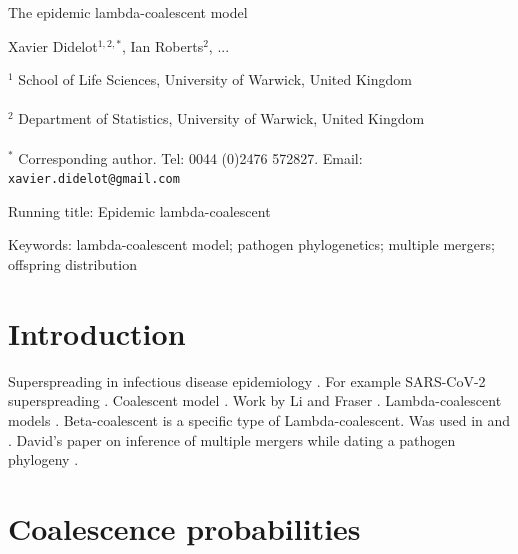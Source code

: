 \documentclass{article}
\begin{document}
{\Large The epidemic lambda-coalescent model}


\vspace*{2cm}
Xavier Didelot$^{1,2,*}$, Ian Roberts$^{2}$, ...

\vspace*{2cm}
$^1$ School of Life Sciences, University of Warwick, United Kingdom\\\\
$^2$ Department of Statistics, University of Warwick, United Kingdom\\\\
$^*$ Corresponding author. Tel: 0044 (0)2476 572827. Email: \verb+xavier.didelot@gmail.com+

\vspace*{2cm}
Running title: Epidemic lambda-coalescent

\vspace*{2cm}
Keywords: lambda-coalescent model; pathogen phylogenetics; multiple mergers; offspring distribution


\newpage
\section{Introduction}

Superspreading in infectious disease epidemiology \citep{Lloyd-Smith2005}.
For example SARS-CoV-2 superspreading \citep{Wang2020,lemieuxPhylogeneticAnalysisSARSCoV22021,gomez-carballaSuperspreadingEmergenceCOVID192021}.
Coalescent model \citep{Kingman1982,Kingman1982a}.
Work by Li and Fraser \citep{Li2017,Fraser2017}.
Lambda-coalescent models \citep{pitmanCoalescentsMultipleCollisions1999,sagitovGeneralCoalescentAsynchronous1999,donnellyParticleRepresentationsMeasureValued1999}. 
Beta-coalescent \citep{schweinsbergCoalescentProcessesObtained2003} is a specific type of Lambda-coalescent. 
Was used in \citep{Hoscheit2019} and \citep{Menardo2021}. 
David's paper on inference of multiple mergers while dating a pathogen phylogeny \citep{Helekal2024}.

\section{Coalescence probabilities}
\end{document}
